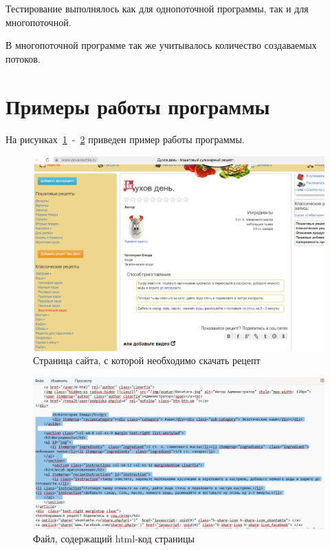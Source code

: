 \documentclass{article}
\begin{document}
Тестирование выполнялось как для однопоточной программы, так и для многопоточной.

В многопоточной программе так же учитывалось количество создаваемых потоков.

\clearpage\section{Примеры работы программы}
На рисунках~\ref{pict:in}~-~\ref{pict:out} приведен пример работы программы.
	
\begin{figure}[h]
	\centering
	\includegraphics[scale=0.4]{tools/in.png}
	\caption{Страница сайта, с которой необходимо скачать рецепт}
	\label{pict:in}
\end{figure}

\begin{figure}[h]
	\centering
	\includegraphics[scale=0.4]{tools/out.png}
	\caption{Файл, содержащий html-код страницы}
	\label{pict:out}
\end{figure}
\end{document}
